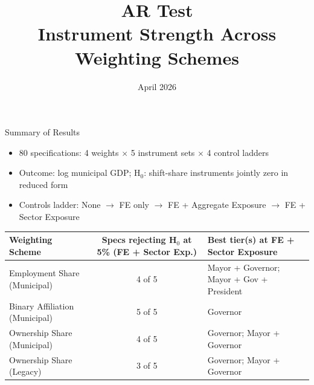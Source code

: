\documentclass[aspectratio=169,11pt]{beamer}
\title{\textbf{AR Test}\\[0.5em]
  \large Instrument Strength Across Weighting Schemes}
\date{April 2026}
\begin{document}
\begin{frame}
  \titlepage
\end{frame}

\begin{frame}{Summary of Results}

\begin{itemize}\setlength{\itemsep}{0.4em}
  \item 80 specifications: 4 weights $\times$ 5 instrument sets $\times$ 4 control ladders
  \item Outcome: log municipal GDP;\quad
        H$_0$: shift-share instruments jointly zero in reduced form
  \item Controls ladder: None $\to$ FE only $\to$ FE + Aggregate Exposure $\to$ FE + Sector Exposure
\end{itemize}

\vspace{0.6em}

{\footnotesize
\setlength{\tabcolsep}{6pt}
\begin{tabular}{@{}lcp{5.5cm}@{}}
\toprule
\textbf{Weighting Scheme}
  & \makecell[c]{\textbf{Specs rejecting H$_0$}\\\textbf{at 5\% (FE + Sector Exp.)}}
  & \textbf{Best tier(s) at FE + Sector Exposure} \\
\midrule
Employment Share (Municipal)       & 4 of 5 & Mayor + Governor;\; Mayor + Gov + President \\
Binary Affiliation (Municipal)     & 5 of 5 & Governor \\
Ownership Share (Municipal)        & 4 of 5 & Governor;\; Mayor + Governor \\
Ownership Share (Legacy)           & 3 of 5 & Governor;\; Mayor + Governor \\
\bottomrule
\end{tabular}}

\end{frame}

\end{document}
